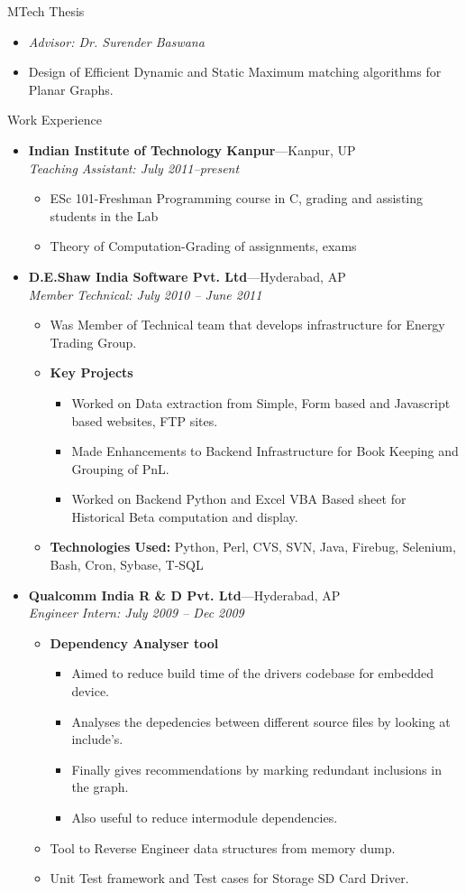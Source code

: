 \documentclass[11pt,oneside]{article}
\newenvironment{ressection}[1]{
	\vspace{4pt}
	{\fontfamily{phv}\selectfont\Large#1}
	\begin{itemize}
	\vspace{3pt}
}{
	\end{itemize}
}
\newcommand{\resitem}[1]{
	\vspace{-4pt}
	\item \begin{flushleft} #1 \end{flushleft}
}
\newcommand{\ressubitem}[1]{
	\vspace{-1pt}
	\item \begin{flushleft} #1 \end{flushleft}
}
\newcommand{\resbigitem}[3]{
	\vspace{-5pt}
	\item
	\textbf{#1}---#2 \\
	\textit{#3}
}
\newenvironment{ressubsec}[3]{
	\resbigitem{#1}{#2}{#3}
	\vspace{-2pt}
	\begin{itemize}
}{
	\end{itemize}
}
\newenvironment{reslist}[1]{
	\resitem{\textbf{#1}}
	\vspace{-5pt}
	\begin{itemize}
}{
	\end{itemize}
}
\begin{document}
\begin{ressection}{MTech Thesis}
    
  \resitem{\textit{Advisor: Dr. Surender Baswana}}
  \resitem{Design of Efficient Dynamic and Static Maximum matching algorithms for Planar Graphs.}
  
\end{ressection}

\begin{ressection}{Work Experience}

	\begin{ressubsec}{Indian Institute of Technology Kanpur}{Kanpur, UP}{Teaching Assistant: July 2011--present}
		\ressubitem{ESc 101-Freshman Programming course in C, grading and assisting students in the Lab}
		\ressubitem{Theory of Computation-Grading of assignments, exams}
	\end{ressubsec}

	\begin{ressubsec}{D.E.Shaw India Software Pvt. Ltd}{Hyderabad, AP}{Member Technical: July 2010 -- June 2011}
		\ressubitem{Was Member of Technical team that develops infrastructure for Energy Trading Group.}
		\begin{reslist}{Key Projects}
		    \ressubitem{Worked on Data extraction from Simple, Form based and Javascript based websites, FTP sites.}
		    \ressubitem{Made Enhancements to Backend Infrastructure for Book Keeping and Grouping of PnL.}
		    \ressubitem{Worked on Backend Python and Excel VBA Based sheet for Historical Beta computation and display.}
		\end{reslist}
		\ressubitem{\textbf{Technologies Used:} Python, Perl, CVS, SVN, Java, Firebug, Selenium, Bash, Cron, Sybase, T-SQL}
	\end{ressubsec}

	\begin{ressubsec}{Qualcomm India R \& D Pvt. Ltd}{Hyderabad, AP}{Engineer Intern: July 2009 -- Dec 2009}
		\begin{reslist}{Dependency Analyser tool}
		    \ressubitem{Aimed to reduce build time of the drivers codebase for embedded device.}
		    \ressubitem{Analyses the depedencies between different source files by looking at include's.}
		    \ressubitem{Finally gives recommendations by marking redundant inclusions in the graph.}
		    \ressubitem{Also useful to reduce intermodule dependencies.}
		\end{reslist}
		    
		\ressubitem{Tool to Reverse Engineer data structures from memory dump.}
		\ressubitem{Unit Test framework and Test cases for Storage SD Card Driver.}
		

\end{ressubsec}
\end{ressection}
\end{document}
